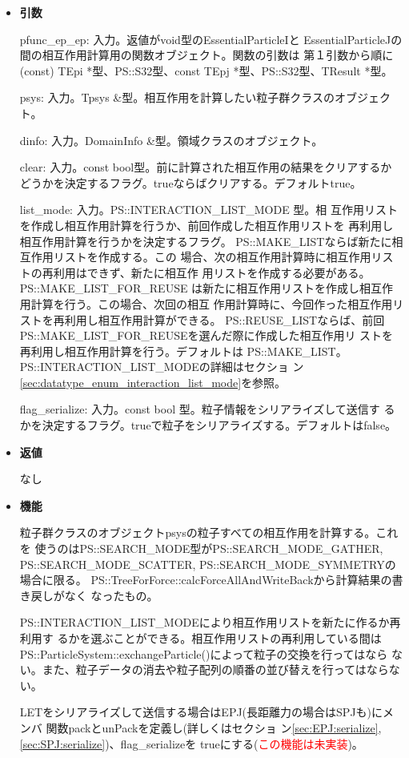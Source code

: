 \begin{itemize}

\item {\bf 引数}

pfunc\_ep\_ep: 入力。返値がvoid型のEssentialParticleIと
EssentialParticleJの間の相互作用計算用の関数オブジェクト。関数の引数は
第１引数から順に(const) TEpi *型、PS::S32型、const
TEpj *型、PS::S32型、TResult *型。

psys: 入力。Tpsys \&型。相互作用を計算したい粒子群クラスのオブジェクト。

dinfo: 入力。DomainInfo \&型。領域クラスのオブジェクト。

clear: 入力。const bool型。前に計算された相互作用の結果をクリアするか
どうかを決定するフラグ。trueならばクリアする。デフォルトtrue。

list\_mode: 入力。PS::INTERACTION\_LIST\_MODE 型。相
互作用リストを作成し相互作用計算を行うか、前回作成した相互作用リストを
再利用し相互作用計算を行うかを決定するフラグ。
PS::MAKE\_LISTならば新たに相互作用リストを作成する。この
場合、次の相互作用計算時に相互作用リストの再利用はできず、新たに相互作
用リストを作成する必要がある。PS::MAKE\_LIST\_FOR\_REUSE
は新たに相互作用リストを作成し相互作用計算を行う。この場合、次回の相互
作用計算時に、今回作った相互作用リストを再利用し相互作用計算ができる。
PS::REUSE\_LISTならば、前回
PS::MAKE\_LIST\_FOR\_REUSEを選んだ際に作成した相互作用リ
ストを再利用し相互作用計算を行う。デフォルトは
PS::MAKE\_LIST。PS::INTERACTION\_LIST\_MODEの詳細はセクショ
ン\ref{sec:datatype_enum_interaction_list_mode}を参照。

flag\_serialize: 入力。const bool 型。粒子情報をシリアライズして送信す
るかを決定するフラグ。trueで粒子をシリアライズする。デフォルトはfalse。

\item {\bf 返値}

なし

\item {\bf 機能}

粒子群クラスのオブジェクトpsysの粒子すべての相互作用を計算する。これを
使うのはPS::SEARCH\_MODE型がPS::SEARCH\_MODE\_GATHER,
PS::SEARCH\_MODE\_SCATTER, PS::SEARCH\_MODE\_SYMMETRYの場合に限る。
PS::TreeForForce::calcForceAllAndWriteBackから計算結果の書き戻しがなく
なったもの。

PS::INTERACTION\_LIST\_MODEにより相互作用リストを新たに作るか再利用す
るかを選ぶことができる。相互作用リストの再利用している間は
PS::ParticleSystem::exchangeParticle()によって粒子の交換を行ってはなら
ない。また、粒子データの消去や粒子配列の順番の並び替えを行ってはならな
い。

LETをシリアライズして送信する場合はEPJ(長距離力の場合はSPJも)にメンバ
関数packとunPackを定義し(詳しくはセクショ
ン\ref{sec:EPJ:serialize},\ref{sec:SPJ:serialize})、flag\_serializeを
trueにする(\textcolor{red}{この機能は未実装})。

\end{itemize}


